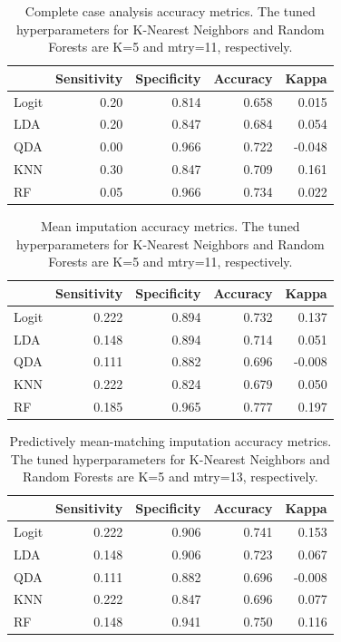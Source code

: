 \documentclass[12pt,]{article}
\begin{document}
\begin{table}[!h]

\caption{\label{tab:unnamed-chunk-5}\label{tab:cc-metrics} Complete case analysis accuracy metrics.  The tuned hyperparameters for K-Nearest Neighbors and Random Forests are K=5 and mtry=11, respectively.}
\centering
\fontsize{10}{12}\selectfont
\begin{tabular}{lrrrr}
\toprule
  & Sensitivity & Specificity & Accuracy & Kappa\\
\midrule
Logit & 0.20 & 0.814 & 0.658 & 0.015\\
LDA & 0.20 & 0.847 & 0.684 & 0.054\\
QDA & 0.00 & 0.966 & 0.722 & -0.048\\
KNN & 0.30 & 0.847 & 0.709 & 0.161\\
RF & 0.05 & 0.966 & 0.734 & 0.022\\
\bottomrule
\end{tabular}
\end{table}

\begin{table}[!h]

\caption{\label{tab:unnamed-chunk-6}\label{tab:mean-metrics} Mean imputation accuracy metrics.  The tuned hyperparameters for K-Nearest Neighbors and Random Forests are K=5 and mtry=11, respectively.}
\centering
\fontsize{10}{12}\selectfont
\begin{tabular}{lrrrr}
\toprule
  & Sensitivity & Specificity & Accuracy & Kappa\\
\midrule
Logit & 0.222 & 0.894 & 0.732 & 0.137\\
LDA & 0.148 & 0.894 & 0.714 & 0.051\\
QDA & 0.111 & 0.882 & 0.696 & -0.008\\
KNN & 0.222 & 0.824 & 0.679 & 0.050\\
RF & 0.185 & 0.965 & 0.777 & 0.197\\
\bottomrule
\end{tabular}
\end{table}

\begin{table}[!h]

\caption{\label{tab:unnamed-chunk-7}\label{tab:pmm-metrics} Predictively mean-matching imputation accuracy metrics.  The tuned hyperparameters for K-Nearest Neighbors and Random Forests are K=5 and mtry=13, respectively.}
\centering
\fontsize{10}{12}\selectfont
\begin{tabular}{lrrrr}
\toprule
  & Sensitivity & Specificity & Accuracy & Kappa\\
\midrule
Logit & 0.222 & 0.906 & 0.741 & 0.153\\
LDA & 0.148 & 0.906 & 0.723 & 0.067\\
QDA & 0.111 & 0.882 & 0.696 & -0.008\\
KNN & 0.222 & 0.847 & 0.696 & 0.077\\
RF & 0.148 & 0.941 & 0.750 & 0.116\\
\bottomrule
\end{tabular}
\end{table}
\end{document}
